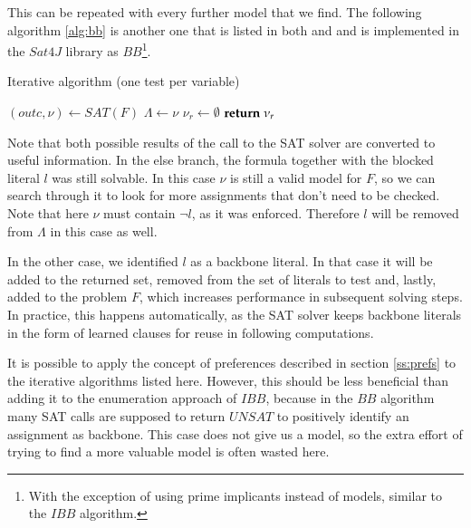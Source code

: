 This can be repeated with every further model that we find. The following algorithm \ref{alg:bb} is another one that is listed in both \cite{mjl10} and \cite{mjl15} and is implemented in the $Sat4J$ library as $BB$\footnote{With the exception of using prime implicants instead of models, similar to the $IBB$ algorithm.}.

\begin{algorithm}[t]
\caption{{\sc Iterative algorithm (one test per variable)}}
\label{alg:bb}
\DontPrintSemicolon
{}

$(outc,\nu) \gets SAT(F)$\;
$\Lambda \gets \nu$\;
$\nu_r \gets \emptyset$\;
$\Return \; \nu_r$\;
\end{algorithm}

Note that both possible results of the call to the SAT solver are converted to useful information. In the else branch, the formula together with the blocked literal $l$ was still solvable. In this case $\nu$ is still a valid model for $F$, so we can search through it to look for more assignments that don't need to be checked. Note that here $\nu$ must contain $\neg l$, as it was enforced. Therefore $l$ will be removed from $\Lambda$ in this case as well.

In the other case, we identified $l$ as a backbone literal. In that case it will be added to the returned set, removed from the set of literals to test and, lastly, added to the problem $F$, which increases performance in subsequent solving steps. In practice, this happens automatically, as the SAT solver keeps backbone literals in the form of learned clauses for reuse in following computations. %

It is possible to apply the concept of preferences described in section \ref{ss:prefs} to the iterative algorithms listed here. However, this should be less beneficial than adding it to the enumeration approach of $IBB$, because in the $BB$ algorithm many SAT calls are supposed to return $UNSAT$ to positively identify an assignment as backbone. This case does not give us a model, so the extra effort of trying to find a more valuable model is often wasted here.

